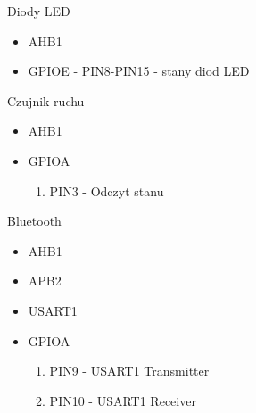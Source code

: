 \documentclass{article}
\begin{document}
Diody LED
\begin{itemize}
    \item AHB1
    \item GPIOE - PIN8-PIN15 - stany diod LED
\end{itemize}

Czujnik ruchu
\begin{itemize}
    \item AHB1
    \item GPIOA
        \begin{enumerate}
            \item PIN3 - Odczyt stanu
        \end{enumerate}
\end{itemize}

Bluetooth
\begin{itemize}
    \item AHB1
    \item APB2
    \item USART1
    \item GPIOA
        \begin{enumerate}
            \item PIN9 - USART1 Transmitter
            \item PIN10 - USART1 Receiver
        \end{enumerate}
\end{itemize}







\end{document}
